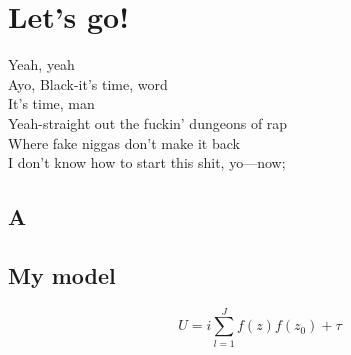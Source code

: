 

\Clear
\chapter{Let's go!}


Yeah, yeah \\
Ayo, Black-it's time, word \\
It's time, man \\
Yeah-straight out the fuckin' dungeons of rap \\
Where fake niggas don't make it back \\
I don't know how to start this shit, yo—now; \\

\section{A}
\label{sec:a}
\lipsum[5]

\begin{subappendices}
	
\section{My model}
\label{sub:my_model}

%
\begin{equation}
	U = i \sum_{l=1}^{J} f(z)f(z_0) + \tau
\end{equation}
%

\end{subappendices}

